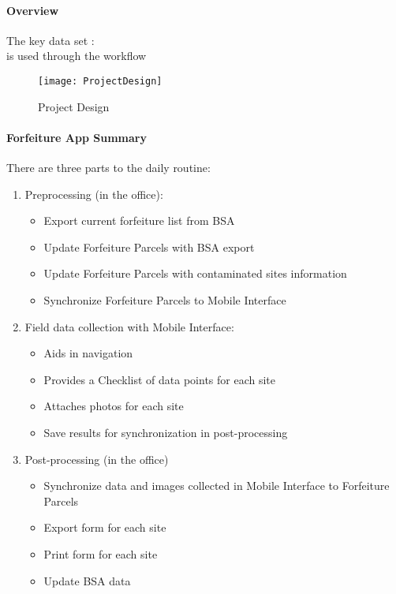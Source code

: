 \documentclass[class=book , crop=false, titlepage, twoside, multi={itemize, figure, verbatim}, float=false]{standalone}
\begin{document}
\paragraph[Overview]{Overview}
\vspace{.20in}

\noindent The key data set : {}\\
is used through the workflow
%
%
\begin{figure}[h!]
\centering
    \texttt{[image: ProjectDesign]}
\caption{Project Design}
\end{figure}
\clearpage
%
%
%
\paragraph{Forfeiture App Summary}
\vspace{.25in}

There are three parts to the daily routine:
\begin{enumerate}
\item \Large Preprocessing \normalsize(in the office):
%
\begin{itemize}
\item Export current forfeiture list from BSA
\item Update Forfeiture Parcels with BSA export
\item Update Forfeiture Parcels with contaminated sites information
\item Synchronize Forfeiture Parcels to Mobile Interface
\end{itemize}
%
\item \Large Field data collection \normalsize with Mobile Interface:
%
\begin{itemize}
\item Aids in navigation
\item Provides a Checklist of data points for each site
\item Attaches photos for each site
\item Save results for synchronization in post-processing
\end{itemize}
%
\item \Large Post-processing \normalsize (in the office)
%
\begin{itemize}
\item Synchronize data and images collected in Mobile Interface to Forfeiture Parcels
\item Export form for each site
\item Print form for each site
\item Update BSA data
%
\end{itemize}
%
\end{enumerate}
%
\clearpage
%
%
%
\end{document}
